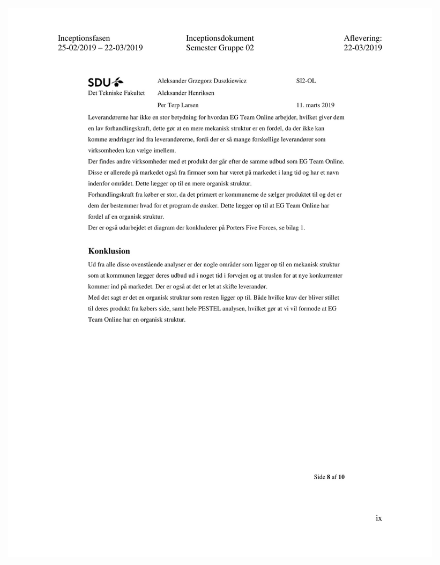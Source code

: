 \begin{figure}[hb]
  \includegraphics[scale = 0.33]{./PNG/Inceptions/Gruppe 02 + InceptionsDokument-42.jpg} 
\end{figure}


